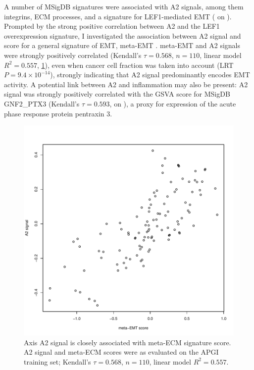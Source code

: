 \documentclass[dissertation.tex]{subfiles}
\begin{document}
A number of \gls{MSigDB} signatures were associated with A2 signals, among them integrins, \gls{ECM} processes, and a signature for LEF1-mediated \gls{EMT} ( on ).  Prompted by the strong positive correlation between A2 and the LEF1 overexpression signature, I investigated the association between A2 signal and score for a general signature of \gls{EMT}, meta-EMT \cite{Groger2012}.  meta-EMT and A2 signals were strongly positively correlated (Kendall's $\tau = 0.568$, $n = 110$, linear model $R^2 = 0.557$, \ref{fig:sigs-axis2-emt}), even when cancer cell fraction was taken into account (LRT $P = 9.4 \times 10^{-14}$), strongly indicating that A2 signal predominantly encodes \gls{EMT} activity.  A potential link between A2 and inflammation may also be present: A2 signal was strongly positively correlated with the \gls{GSVA} score for \gls{MSigDB} GNF2\_PTX3 (Kendall's $\tau = 0.593$,  on ), a proxy for expression of the acute phase response protein pentraxin 3.

\begin{figure}
\centering
\includegraphics[width=.7\linewidth]{analysis/biosurv/reports/18_SIS_diag_dsd_final/figure/nmf-msigdb-cor-plots-10}
\caption[A2 signal is closely associated with meta-EMT score]{Axis A2 signal is closely associated with meta-ECM signature score.  A2 signal and meta-ECM \cite{Groger2012} scores were as evaluated on the \acrshort{APGI} training set; Kendall's $\tau = 0.568$, $n = 110$, linear model $R^2 = 0.557$.}\label{fig:sigs-axis2-emt}
\end{figure}
\end{document}
